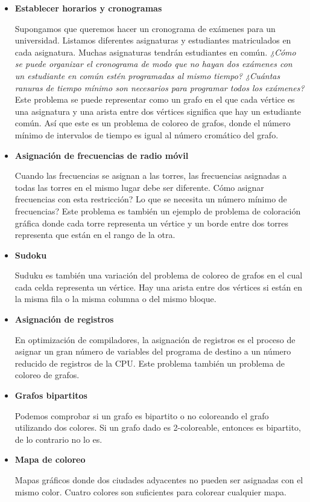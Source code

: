 \documentclass[11pt,a4paper]{article}
\theoremstyle{plain}
\begin{document}
\begin{itemize}

\item{\textbf{{{{Establecer horarios y cronogramas}}}}}

Supongamos que queremos hacer un cronograma de exámenes para un universidad. Listamos diferentes asignaturas y estudiantes matriculados en cada asignatura. Muchas asignaturas tendrán estudiantes en común. \emph{¿Cómo se puede organizar el cronograma de modo que no hayan dos exámenes con un estudiante en común estén programadas al mismo tiempo? ¿Cuántas ranuras de tiempo mínimo son necesarios para programar todos los exámenes?} Este problema se puede representar como un grafo en el que cada vértice es una asignatura y una arista entre dos vértices significa que hay un estudiante común. Así que este es un problema de coloreo de grafos, donde el número mínimo de intervalos de tiempo es igual al número cromático del grafo.

\item{\textbf{{{Asignación de frecuencias de radio móvil}}}}

Cuando las frecuencias se asignan a las torres, las frecuencias asignadas a todas las torres en el mismo lugar debe ser diferente. Cómo asignar frecuencias con esta restricción? Lo que se necesita un número mínimo de frecuencias? Este problema es también un ejemplo de problema de coloración gráfica donde cada torre representa un vértice y un borde entre dos torres representa que están en el rango de la otra.

\item{\textbf{{{Sudoku}}}}

Suduku es también una variación del problema de coloreo de grafos en el cual cada celda representa un vértice. Hay una arista entre dos vértices si están en la misma fila o la misma columna o del mismo bloque.

\item{\textbf{{{Asignación de registros}}}}

En optimización de compiladores, la asignación de registros es el proceso de asignar un gran número de variables del programa de destino a un número reducido de registros de la CPU. Este problema también un problema de coloreo de grafos.

\item{\textbf{{{Grafos bipartitos}}}}

Podemos comprobar si un grafo es bipartito o no coloreando el grafo utilizando dos colores. Si un grafo dado es 2-coloreable, entonces es bipartito, de lo contrario no lo es. 
 
\item{\textbf{{{Mapa de coloreo}}}}

Mapas gráficos donde dos ciudades adyacentes no pueden ser asignadas con el mismo color. Cuatro colores son suficientes para colorear cualquier mapa\cite {2}.

\end{itemize}
 
\end{document}
